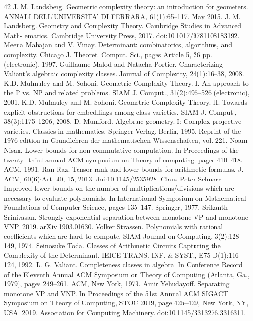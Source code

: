 \documentclass[10pt,a4paper]{article}
\begin{document}
\begin{thebibliography}{42}
 J. M. Landsberg. Geometric complexity theory: an introduction for geometers. ANNALI DELL’UNIVERSITA’ DI FERRARA, 61(1):65–117, May 2015.
 J. M. Landsberg. Geometry and Complexity Theory. Cambridge Studies in Advanced Math- ematics. Cambridge University Press, 2017. doi:10.1017/9781108183192.
 Meena Mahajan and V. Vinay. Determinant: combinatorics, algorithms, and complexity. Chicago J. Theoret. Comput. Sci., pages Article 5, 26 pp. (electronic), 1997.
 Guillaume Malod and Natacha Portier. Characterizing Valiant’s algebraic complexity classes. Journal of Complexity, 24(1):16–38, 2008.
 K.D. Mulmuley and M. Sohoni. Geometric Complexity Theory. I. An approach to the P vs. NP and related problems. SIAM J. Comput., 31(2):496–526 (electronic), 2001.
 K.D. Mulmuley and M. Sohoni. Geometric Complexity Theory. II. Towards explicit obstructions for embeddings among class varieties. SIAM J. Comput., 38(3):1175–1206, 2008.
 D. Mumford. Algebraic geometry. I: Complex projective varieties. Classics in mathematics. Springer-Verlag, Berlin, 1995. Reprint of the 1976 edition in Grundlehren der mathematischen Wissenschaften, vol. 221.
 Noam Nisan. Lower bounds for non-commutative computation. In Proceedings of the twenty- third annual ACM symposium on Theory of computing, pages 410–418. ACM, 1991.
 Ran Raz. Tensor-rank and lower bounds for arithmetic formulas. J. ACM, 60(6):Art. 40, 15, 2013. doi:10.1145/2535928.
 Claus-Peter Schnorr. Improved lower bounds on the number of multiplications/divisions which are necessary to evaluate polynomials. In International Symposium on Mathematical Foundations of Computer Science, pages 135–147. Springer, 1977.
 Srikanth Srinivasan. Strongly exponential separation between monotone VP and monotone VNP, 2019. arXiv:1903.01630.
 Volker Strassen. Polynomials with rational coefficients which are hard to compute. SIAM Journal on Computing, 3(2):128–149, 1974.
 Seinosuke Toda. Classes of Arithmetic Circuits Capturing the Complexity of the Determinant. IEICE TRANS. INF. \& SYST., E75-D(1):116–124, 1992.
 L. G. Valiant. Completeness classes in algebra. In Conference Record of the Eleventh Annual ACM Symposium on Theory of Computing (Atlanta, Ga., 1979), pages 249–261. ACM, New York, 1979.
 Amir Yehudayoff. Separating monotone VP and VNP. In Proceedings of the 51st Annual ACM SIGACT Symposium on Theory of Computing, STOC 2019, page 425–429, New York, NY, USA, 2019. Association for Computing Machinery. doi:10.1145/3313276.3316311.
\end{thebibliography}
\end{document}
